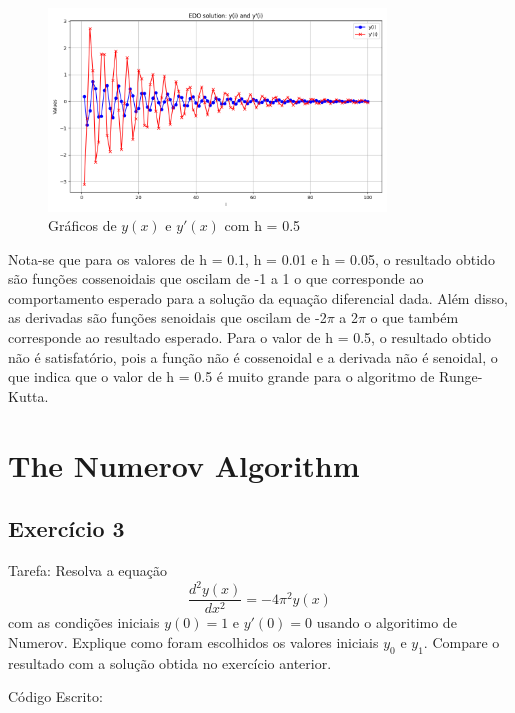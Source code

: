 \documentclass[12pt, a4paper]{article} %
\begin{document}
        \begin{figure}[H]
            \centering
            \includegraphics[width=0.8\textwidth]{../images/results-ex-2-3.png}
            \caption{Gr\'aficos de $y(x)$ e $y'(x)$ com h = 0.5}
        \end{figure}

        Nota-se que para os valores de h = 0.1, h = 0.01 e h = 0.05, o resultado obtido s\~ao fun\c{c}\~oes cossenoidais que oscilam de -1 a 1 o que corresponde ao comportamento esperado para a solu\c{c}\~ao da equa\c{c}\~ao diferencial dada. Al\'em disso, as derivadas s\~ao fun\c{c}\~oes senoidais que oscilam de -2$\pi$ a 2$\pi$ o que tamb\'em corresponde ao resultado esperado. Para o valor de h = 0.5, o resultado obtido n\~ao \'e satisfat\'orio, pois a fun\c{c}\~ao n\~ao \'e cossenoidal e a derivada n\~ao \'e senoidal, o que indica que o valor de h = 0.5 \'e muito grande para o algoritmo de Runge-Kutta.

\section{The Numerov Algorithm}

    \subsection{Exerc\'icio 3}

        Tarefa: Resolva a equa\c{c}\~ao
        \begin{equation*}
            \frac{d^{2}y(x)}{dx^{2}} = -4\pi^{2}y(x)
        \end{equation*}
        com as condi\c{c}\~oes iniciais $y(0) = 1$ e $y'(0) = 0$ usando o algoritimo de Numerov. Explique como foram escolhidos os valores iniciais $y_{0}$ e $y_{1}$. Compare o resultado com a solu\c{c}\~ao obtida no exerc\'icio anterior.

        C\'odigo Escrito:
        
\end{document}
